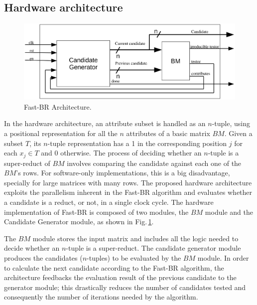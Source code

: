 \documentclass[authoryear,preprint,review,12pt]{elsarticle}
\begin{document}
\subsection{Hardware architecture}
\label{sect:4}

\begin{figure}[htb]
    \begin{center}
        \includegraphics[width=13cm]{CT-ext_arq.eps}
    \end{center}
\caption{Fast-BR Architecture.}
\label{fig:3}
\end{figure}

In the hardware architecture, an attribute subset is handled as an $n$-tuple, using a positional 
representation for all the $n$ attributes of a basic matrix $BM$. Given a subset $T$, its $n$-tuple representation 
has a 1 in the corresponding position $j$ for each $x_j \in T$ and 0 otherwise.
The process of deciding whether an $n$-tuple is a super-reduct of $BM$ involves
comparing the candidate against each one of the $BM$'s rows. For
software-only implementations, this is a big disadvantage, specially for large 
matrices with many rows. The proposed hardware architecture exploits the parallelism 
inherent in the Fast-BR algorithm
and evaluates whether a candidate is a reduct, or not, in a single
clock cycle. The hardware implementation of Fast-BR is composed of two modules, the $BM$ module and the Candidate Generator module, as shown in
Fig.\,\ref{fig:3}. 

The $BM$ module stores the input matrix and
includes all the logic needed to decide whether an $n$-tuple is a super-reduct. The candidate
generator module produces the candidates ($n$-tuples) to be
evaluated by the $BM$ module. In order to calculate the next candidate
according to the Fast-BR algorithm, the architecture feedbacks the
evaluation result of the previous candidate to the generator module;
this drastically reduces the number of candidates tested and
consequently the number of iterations needed by the algorithm. 
\end{document}
